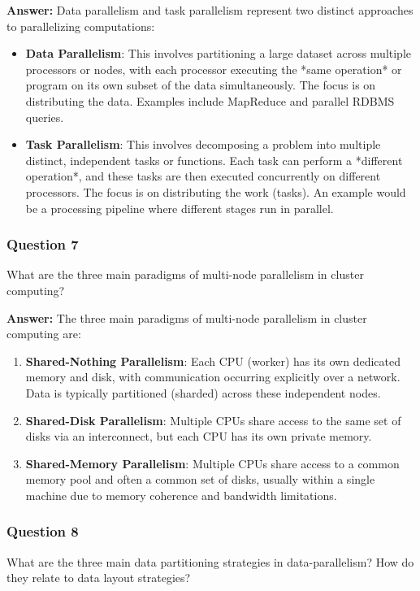 \documentclass{article}
\begin{document}
\textbf{Answer:}
Data parallelism and task parallelism represent two distinct approaches to parallelizing computations:
\begin{itemize}
    \item \textbf{Data Parallelism}: This involves partitioning a large dataset across multiple processors or nodes, with each processor executing the *same operation* or program on its own subset of the data simultaneously. The focus is on distributing the data. Examples include MapReduce and parallel RDBMS queries.
    \item \textbf{Task Parallelism}: This involves decomposing a problem into multiple distinct, independent tasks or functions. Each task can perform a *different operation*, and these tasks are then executed concurrently on different processors. The focus is on distributing the work (tasks). An example would be a processing pipeline where different stages run in parallel.
\end{itemize}

\subsubsection*{Question 7}
What are the three main paradigms of multi-node parallelism in cluster computing? 

\textbf{Answer:}
The three main paradigms of multi-node parallelism in cluster computing are:
\begin{enumerate}
    \item \textbf{Shared-Nothing Parallelism}: Each CPU (worker) has its own dedicated memory and disk, with communication occurring explicitly over a network. Data is typically partitioned (sharded) across these independent nodes.
    \item \textbf{Shared-Disk Parallelism}: Multiple CPUs share access to the same set of disks via an interconnect, but each CPU has its own private memory.
    \item \textbf{Shared-Memory Parallelism}: Multiple CPUs share access to a common memory pool and often a common set of disks, usually within a single machine due to memory coherence and bandwidth limitations.
\end{enumerate}

\subsubsection*{Question 8}
What are the three main data partitioning strategies in data-parallelism? How do they relate to data layout strategies? 
\end{document}
